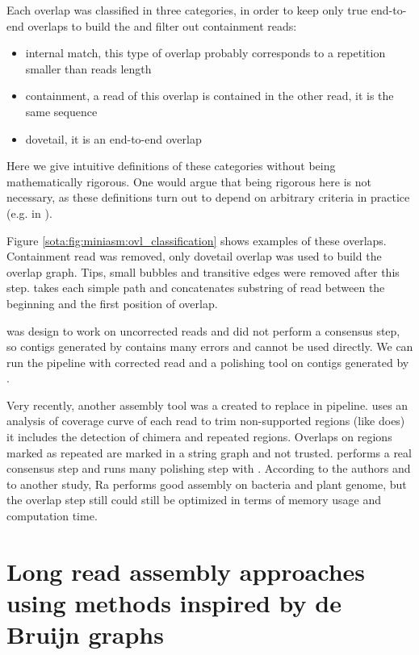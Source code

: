 \documentclass[main]{subfiles}
\begin{document}
Each overlap was classified in three categories, in order to keep only true end-to-end overlaps to build the \OLC and filter out containment reads:
\begin{itemize}
    \item internal match, this type of overlap probably corresponds to a repetition smaller than reads length
    \item containment, a read of this overlap is contained in the other read, it is the same sequence
    \item dovetail, it is an end-to-end overlap
\end{itemize}
Here we give intuitive definitions of these categories without being mathematically rigorous. One would argue that being rigorous here is not necessary, as these definitions turn out to depend on arbitrary criteria in practice (e.g. in \miniasm).

Figure \ref{sota:fig:miniasm:ovl_classification} shows examples of these overlaps. Containment read was removed, only dovetail overlap was used to build the overlap graph. Tips, small bubbles and transitive edges were removed after this step. \miniasm takes each simple path and concatenates substring of read between the beginning and the first position of overlap.

\miniasm was design to work on uncorrected reads and did not perform a consensus step, so contigs generated by \miniasm contains many errors and cannot be used directly. We can run the \minimap \miniasm pipeline with corrected read and a polishing tool on contigs generated by \miniasm.

Very recently, another assembly tool \cite{Ra} was a created to replace \miniasm in \minimap \miniasm pipeline.  uses an analysis of coverage curve of each read to trim non-supported regions (like \miniasm does) it includes the detection of chimera and repeated regions. Overlaps on regions marked as repeated are marked in a string graph and not trusted.  performs a real consensus step and runs many polishing step with . According to the authors and to another study\cite{long_read_assembler_comparison}, Ra performs good assembly on bacteria and plant genome, but the overlap step still could still be optimized in terms of memory usage and computation time.

\section{Long read assembly approaches using methods inspired by de Bruijn graphs} \label{section:sota:wtdbg}
\end{document}
